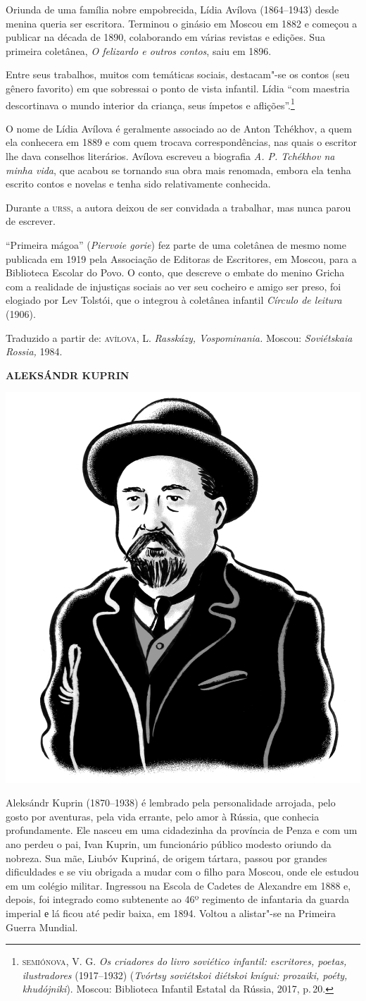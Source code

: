 \noindent{}Oriunda de uma família nobre empobrecida, Lídia Avílova (1864--1943)
desde menina queria ser escritora. Terminou o ginásio em Moscou em 1882
e começou a publicar na década de 1890, colaborando em várias revistas e
edições. Sua primeira coletânea, \emph{O felizardo e outros contos},
saiu em 1896.

Entre seus trabalhos, muitos com temáticas sociais, destacam"-se os
contos (seu gênero favorito) em que sobressai o ponto de vista infantil.
Lídia ``com maestria descortinava o mundo interior da criança, seus
ímpetos e aflições''.\footnote{\scriptsize\textsc{semiónova}, V. G. \emph{Os criadores do
  livro soviético infantil: escritores, poetas, ilustradores}
  (1917--1932) (\emph{Tvórtsy soviétskoi diétskoi knígui: prozaiki,
  poéty, khudójniki}). Moscou: Biblioteca Infantil Еstatal da Rússia,
  2017, p.\,20.}

O nome de Lídia Avílova é geralmente associado ao de Anton Tchékhov, a
quem ela conhecera em 1889 e com quem trocava correspondências, nas
quais o escritor lhe dava conselhos literários. Avílova escreveu a
biografia \emph{A. P. Tchékhov na minha vida}, que acabou se tornando
sua obra mais renomada, embora ela tenha escrito contos e novelas e
tenha sido relativamente conhecida.

Durante a \textsc{urss}, a autora deixou de ser convidada a trabalhar, mas nunca
parou de escrever.

``Primeira mágoa'' (\emph{Piervoie gorie}) fez parte de uma coletânea de
mesmo nome publicada em 1919 pela Associação de Editoras de
Escritores, em Moscou, para a Biblioteca Escolar do Povo. O
conto, que descreve o embate do menino Gricha com a realidade de
injustiças sociais ao ver seu cocheiro e amigo ser preso, foi elogiado
por Lev Tolstói, que o integrou à coletânea infantil \emph{Círculo de
leitura} (1906).

Traduzido a partir de:
\textsc{avílova}, L. \emph{Rasskázy, Vospominania.} Moscou: \emph{Soviétskaia
Rossia,} 1984.

\pagebreak
\noindent\textbf{ALEKSÁNDR KUPRIN}\medskip

\noindent\includegraphics[width=.8in]{./imgs/autor9.jpg}

\noindent{}Aleksándr Kuprin (1870--1938) é lembrado pela personalidade arrojada,
pelo gosto por aventuras, pela vida errante, pelo amor à Rússia, que
conhecia profundamente. Ele nasceu em uma cidadezinha da província de
Penza e com um ano perdeu o pai, Ivan Kuprin, um
funcionário público modesto oriundo da nobreza. Sua mãe, Liubóv Kupriná, de origem tártara, passou por grandes dificuldades e se
viu obrigada a mudar com o filho para Moscou, onde ele estudou em um
colégio militar. Ingressou na Escola de Cadetes de Alexandre em 1888 e,
depois, foi integrado como subtenente ao 46º regimento de infantaria da
guarda imperial е lá ficou até pedir baixa, em 1894. Voltou a alistar"-se
na Primeira Guerra Mundial.

